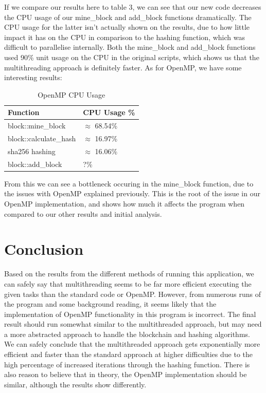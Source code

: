 \documentclass[12pt, a4paper]{article}
\begin{document}
If we compare our results here to table 3, we can see that our new code decreases the CPU usage of our mine\_block and add\_block functions dramatically. The CPU usage for the latter isn't actually shown on the results, due to how little impact it has on the CPU in comparison to the hashing function, which was difficult to parallelise internally. Both the mine\_block and add\_block functions used 90\% unit usage on the CPU in the original scripts, which shows us that the multithreading approach is definitely faster. As for OpenMP, we have some interesting results: \\

\begin{table}[H]
    \centering
    \begin{tabular}{| l | l |}
    \hline
    Function & CPU Usage \%  \\ \hline
    block::mine\_block & $\approx$ 68.54\% \\ \hline
    block::calculate\_hash & $\approx$ 16.97\% \\ \hline
    sha256 hashing & $\approx$ 16.06\% \\ \hline
    block::add\_block & ?\% \\ \hline
    \end{tabular}
    \caption{OpenMP CPU Usage}
\end{table}

From this we can see a bottleneck occuring in the mine\_block function, due to the issues with OpenMP explained previously. This is the root of the issue in our OpenMP implementation, and shows how much it affects the program when compared to our other results and initial analysis.

\section{Conclusion}
Based on the results from the different methods of running this application, we can safely say that multithreading seems to be far more efficient executing the given tasks than the standard code or OpenMP. However, from numerous runs of the program and some background reading, it seems likely that the implementation of OpenMP functionality in this program is incorrect. The final result should run somewhat similar to the multithreaded approach, but may need a more abstracted approach to handle the blockchain and hashing algorithms. \\
We can safely conclude that the multithreaded approach gets exponentially more efficient and faster than the standard approach at higher difficulties due to the high percentage of increased iterations through the hashing function. There is also reason to believe that in theory, the OpenMP implementation should be similar, although the results show differently. 

\newpage


{}
\nocite{*}
\end{document}
